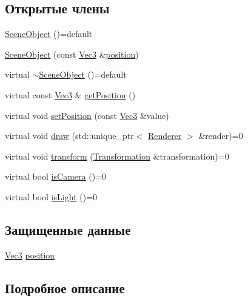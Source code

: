 \subsection*{Открытые члены}
\begin{DoxyCompactItemize}
\item 
\hyperlink{class_scene_object_a39ac215b0b6183ac251a26a522acde14}{Scene\+Object} ()=default
\item 
\hyperlink{class_scene_object_ad7093f7620ca338f97d98651fd6c87a9}{Scene\+Object} (const \hyperlink{vec3_8h_a221ad8ea4d9be4111628ee1ca22ee3ba}{Vec3} \&\hyperlink{class_scene_object_af190cdf9b9449f96f73d836848ce4ad3}{position})
\item 
virtual \hyperlink{class_scene_object_a0b8708ffea012cd61f583103bf84b531}{$\sim$\+Scene\+Object} ()=default
\item 
virtual const \hyperlink{vec3_8h_a221ad8ea4d9be4111628ee1ca22ee3ba}{Vec3} \& \hyperlink{class_scene_object_a9e5d8a20e5e0123e894c2918b0e39dc3}{get\+Position} ()
\item 
virtual void \hyperlink{class_scene_object_ae0e79b1773e3e3357d1dcf302463e46a}{set\+Position} (const \hyperlink{vec3_8h_a221ad8ea4d9be4111628ee1ca22ee3ba}{Vec3} \&value)
\item 
virtual void \hyperlink{class_scene_object_adc906ce4e4a896a351949ccabfd44016}{draw} (std\+::unique\+\_\+ptr$<$ \hyperlink{class_renderer}{Renderer} $>$ \&render)=0
\item 
virtual void \hyperlink{class_scene_object_a1b8a4b90f1200f1cd025d95964d43630}{transform} (\hyperlink{class_transformation}{Transformation} \&transformation)=0
\item 
virtual bool \hyperlink{class_scene_object_a6d7cb8b9a2c29f38fd039731e83167f4}{is\+Camera} ()=0
\item 
virtual bool \hyperlink{class_scene_object_a9c5b006b8a0e457634f15c19eb51ca73}{is\+Light} ()=0
\end{DoxyCompactItemize}
\subsection*{Защищенные данные}
\begin{DoxyCompactItemize}
\item 
\hyperlink{vec3_8h_a221ad8ea4d9be4111628ee1ca22ee3ba}{Vec3} \hyperlink{class_scene_object_af190cdf9b9449f96f73d836848ce4ad3}{position}
\end{DoxyCompactItemize}


\subsection{Подробное описание}


